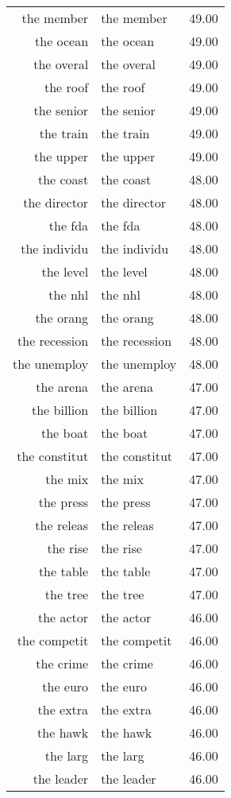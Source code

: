 \begin{table}[ht]
\begin{tabular}{rlr}
  the member & the member & 49.00 \\ 
  the ocean & the ocean & 49.00 \\ 
  the overal & the overal & 49.00 \\ 
  the roof & the roof & 49.00 \\ 
  the senior & the senior & 49.00 \\ 
  the train & the train & 49.00 \\ 
  the upper & the upper & 49.00 \\ 
  the coast & the coast & 48.00 \\ 
  the director & the director & 48.00 \\ 
  the fda & the fda & 48.00 \\ 
  the individu & the individu & 48.00 \\ 
  the level & the level & 48.00 \\ 
  the nhl & the nhl & 48.00 \\ 
  the orang & the orang & 48.00 \\ 
  the recession & the recession & 48.00 \\ 
  the unemploy & the unemploy & 48.00 \\ 
  the arena & the arena & 47.00 \\ 
  the billion & the billion & 47.00 \\ 
  the boat & the boat & 47.00 \\ 
  the constitut & the constitut & 47.00 \\ 
  the mix & the mix & 47.00 \\ 
  the press & the press & 47.00 \\ 
  the releas & the releas & 47.00 \\ 
  the rise & the rise & 47.00 \\ 
  the table & the table & 47.00 \\ 
  the tree & the tree & 47.00 \\ 
  the actor & the actor & 46.00 \\ 
  the competit & the competit & 46.00 \\ 
  the crime & the crime & 46.00 \\ 
  the euro & the euro & 46.00 \\ 
  the extra & the extra & 46.00 \\ 
  the hawk & the hawk & 46.00 \\ 
  the larg & the larg & 46.00 \\ 
  the leader & the leader & 46.00 \\ 

\end{tabular}
\end{table}
